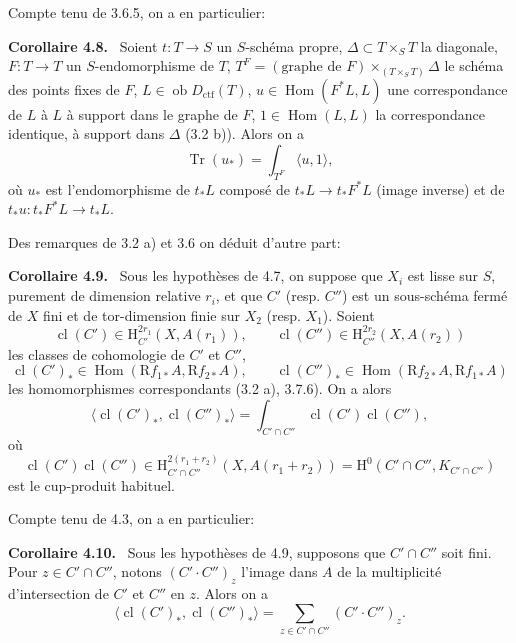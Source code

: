 \documentclass[11pt]{article}
\newenvironment{statement}[1]{\par\medskip\noindent\textbf{#1.}\ }{\par\medskip}
\renewcommand{\H}{\mathrm{H}}
\DeclareMathOperator{\Hom}{Hom}
\newcommand{\R}{\mathrm{R}}\newcommand{\RHomCore}{\mathrm{RHom}}
\newcommand{\ob}{\operatorname{ob}}
\providecommand{\Dctf}{D_{\mathrm{ctf}}}
\providecommand{\cl}{\operatorname{cl}}
\providecommand{\Tr}{\operatorname{Tr}}
\providecommand{\Tr}{\operatorname{Tr}}
\providecommand{\Dctf}{D_{\mathrm{ctf}}}
\providecommand{\Tr}{\operatorname{Tr}}
\providecommand{\Hom}{\operatorname{Hom}}
\providecommand{\ob}{\operatorname{ob}}
\providecommand{\R}{\mathrm R}
\providecommand{\Tr}{\operatorname{Tr}}
\providecommand{\cl}{\operatorname{cl}}
\providecommand{\Hom}{\operatorname{Hom}}
\providecommand{\cl}{\operatorname{cl}}
\providecommand{\Tr}{\operatorname{Tr}}
\begin{document}
Compte tenu de 3.6.5, on a en particulier:

\begin{statement}{Corollaire 4.8}
Soient $t:T\longrightarrow S$ un $S$-schéma propre, $\Delta\subset T\times_S T$ la diagonale, $F:T\longrightarrow T$ un $S$-endomorphisme de $T$, $T^F=(\text{graphe de }F)\times_{(T\times_S T)}\Delta$ le schéma des points fixes de $F$, $L\in\ob\Dctf(T)$, $u\in\Hom(F^*L,L)$ une correspondance de $L$ à $L$ à support dans le graphe de $F$, $1\in\Hom(L,L)$ la correspondance identique, à support dans $\Delta$ (3.2 b)). Alors on a
\[
\Tr(u_*)=\int_{T^F}\langle u,1\rangle,
\]
où $u_*$ est l'endomorphisme de $t_*L$ composé de $t_*L\longrightarrow t_*F^*L$ (image inverse) et de $t_*u:t_*F^*L\longrightarrow t_*L$.
\end{statement}

Des remarques de 3.2 a) et 3.6 on déduit d'autre part:

\begin{statement}{Corollaire 4.9}
Sous les hypothèses de 4.7, on suppose que $X_i$ est lisse sur $S$, purement de dimension relative $r_i$, et que $C'$ (resp. $C''$) est un sous-schéma fermé de $X$ fini et de tor-dimension finie sur $X_2$ (resp. $X_1$). Soient
\[
\cl(C')\in \H_{C'}^{2r_1}(X,A(r_1)),\qquad
\cl(C'')\in \H_{C''}^{2r_2}(X,A(r_2))
\]
les classes de cohomologie de $C'$ et $C''$,
\[
\cl(C')_*\in\Hom(\R f_{1*}A,\R f_{2*}A),\qquad
\cl(C'')_*\in\Hom(\R f_{2*}A,\R f_{1*}A)
\]
les homomorphismes correspondants (3.2 a), 3.7.6). On a alors
\[
\langle \cl(C')_*,\cl(C'')_*\rangle
=
\int_{C'\cap C''}\cl(C')\cl(C''),
\]
où
\[
\cl(C')\cl(C'')\in
\H_{C'\cap C''}^{2(r_1+r_2)}(X,A(r_1+r_2))
=
\H^0(C'\cap C'',K_{C'\cap C''})
\]
est le cup-produit habituel.
\end{statement}

Compte tenu de 4.3, on a en particulier:

\begin{statement}{Corollaire 4.10}
Sous les hypothèses de 4.9, supposons que $C'\cap C''$ soit fini. Pour $z\in C'\cap C''$, notons $(C'\!\cdot C'')_z$ l'image dans $A$ de la multiplicité d'intersection de $C'$ et $C''$ en $z$. Alors on a
\[
\langle \cl(C')_*,\cl(C'')_*\rangle
=
\sum_{z\in C'\cap C''}(C'\!\cdot C'')_z.
\]
\end{statement}
\end{document}
